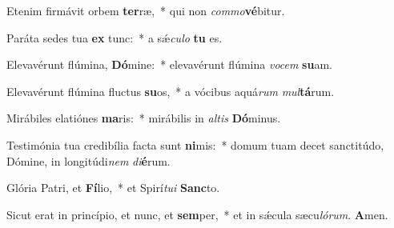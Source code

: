 Etenim firmávit orbem \textbf{ter}ræ,~* qui non \textit{com}\textit{mo}\textbf{vé}bitur.

Paráta sedes tua \textbf{ex} tunc:~* a sǽ\textit{cu}\textit{lo} \textbf{tu} es.

Elevavérunt flúmina, \textbf{Dó}mine:~* elevavérunt flúmina \textit{vo}\textit{cem} \textbf{su}am.

Elevavérunt flúmina fluctus \textbf{su}os,~* a vócibus aquá\textit{rum} \textit{mul}\textbf{tá}rum.

Mirábiles elatiónes \textbf{ma}ris:~* mirábilis in \textit{al}\textit{tis} \textbf{Dó}minus.

Testimónia tua credibília facta sunt \textbf{ni}mis:~* domum tuam decet sanctitúdo, Dómine, in longitúdi\textit{nem} \textit{di}\textbf{é}rum.

Glória Patri, et \textbf{Fí}lio,~* et Spirí\textit{tu}\textit{i} \textbf{Sanc}to.

Sicut erat in princípio, et nunc, et \textbf{sem}per,~* et in sǽcula sæcu\textit{ló}\textit{rum}. \textbf{A}men.

